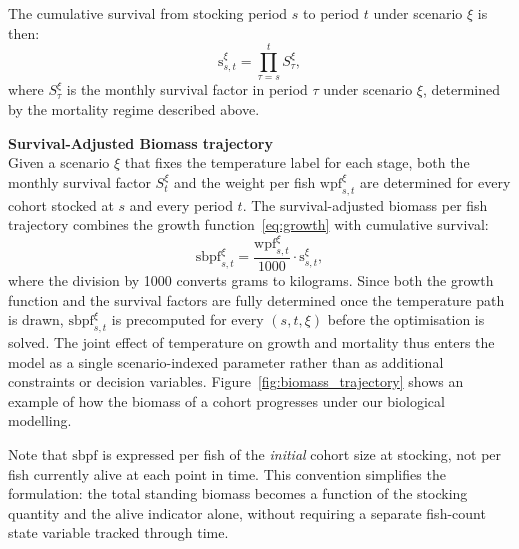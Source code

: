 \documentclass[12pt,a4paper]{article}
\begin{document}
The cumulative survival from stocking period $s$ to period $t$ under scenario $\xi$ is then:
\begin{equation}
    \mathrm{s}^{\xi}_{s,t} = \prod_{\tau = s}^{t} S^{\xi}_{\tau},
\end{equation}
where $S^{\xi}_{\tau}$ is the monthly survival factor in period $\tau$ under scenario $\xi$, determined by the mortality regime described above.
 
\noindent \textbf{Survival-Adjusted Biomass trajectory}
\label{par:biomasstrajectory}\\
Given a scenario $\xi$ that fixes the temperature label for each stage, both the monthly survival factor $S^\xi_t$ and the weight per fish $\mathrm{wpf}^\xi_{s,t}$ are determined for every cohort stocked at $s$ and every period $t$. The survival-adjusted biomass per fish trajectory combines the growth function~\eqref{eq:growth} with cumulative survival:
\begin{equation}
  \label{eq:sbpf}
  \mathrm{sbpf}^{\xi}_{s,t}
    = \frac{\mathrm{wpf}^{\xi}_{s,t}}{1000} \cdot
      \mathrm{s}^{\xi}_{s,t},
\end{equation}
where the division by 1000 converts grams to kilograms. Since both the growth function and the survival factors are fully determined once the temperature path is drawn, $\mathrm{sbpf}^{\xi}_{s,t}$ is precomputed for every $(s, t, \xi)$ before the optimisation is solved. The joint effect of temperature on growth and mortality thus enters the model as a single scenario-indexed parameter rather than as additional constraints or decision variables. Figure~\ref{fig:biomass_trajectory} shows an example of how the biomass of a cohort progresses under our biological modelling.
 
Note that $\mathrm{sbpf}$ is expressed per fish of the \emph{initial} cohort size at stocking, not per fish currently alive at each point in time. This convention simplifies the formulation: the total standing biomass becomes a function of the stocking quantity and the alive indicator alone, without requiring a separate fish-count state variable tracked through time.
 
\end{document}
